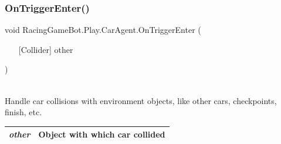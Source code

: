 \subsubsection{\texorpdfstring{OnTriggerEnter()}{OnTriggerEnter()}}
{\footnotesize\ttfamily void RacingGameBot.Play.CarAgent.OnTriggerEnter (\begin{itemize}
    \item[] [{Collider}]{ other }
\end{itemize}\hspace{0.5cm})}\\
Handle car collisions with environment objects, like other cars, checkpoints, finish, etc. \\
\begin{tabular}{|c|c|}
\hline
{\em other} & Object with which car collided\\
\hline
\end{tabular}
